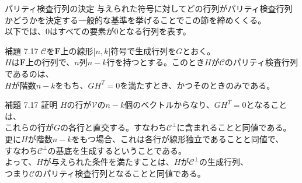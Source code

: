 \documentclass[dvipdfmx,10pt,jsarticle]{beamer}
\begin{document}
  \begin{frame}{パリティ検査行列の決定}
    与えられた符号に対してどの行列がパリティ検査行列かどうかを決定する一般的な基準を挙げることでこの節を締めくくる。\\
    以下では、$0$はすべての要素が$0$となる行列を表す。
    \begin{block}{補題 7.17}
      $\mathcal{C}$を$\mathbf{F}$上の線形$\lbrack n,k\rbrack$符号で生成行列を$G$とおく。\\
      $H$は$\mathbf{F}$上の行列で、$n$列$n-k$行を持つとする。このとき$H$が$\mathcal{C}$のパリティ検査行列であるのは、\\
      $H$が階数$n-k$をもち、$GH^T = 0$を満たすとき、かつそのときのみである。
    \end{block}
  \end{frame}
  \begin{frame}{補題 7.17 証明}
    $H$の行が$\mathcal{V}$の$n-k$個のベクトルからなり、$GH^T = 0$となることは、 \\
    これらの行が$G$の各行と直交する。すなわち$\mathcal{C}^\perp$に含まれることと同値である。\\
    更に$H$が階数$n-k$をもつ場合、これは各行が線形独立であることと同値で、 \\ すなわち$\mathcal{C}^\perp$の基底を生成するということである。\\
    よって、$H$が与えられた条件を満たすことは、$H$が$\mathcal{C}^\perp$の生成行列、\\ つまり$\mathcal{C}$のパリティ検査行列となることと同値である。
  \end{frame}
\end{document}
